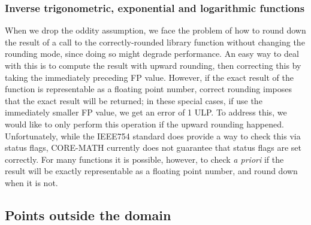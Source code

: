 \subsubsection{Inverse trigonometric, exponential and logarithmic functions}
When we drop the oddity assumption, we face the problem of how to round down the result of a call to the correctly-rounded library function without changing the rounding mode, since doing so might degrade performance.
An easy way to deal with this is to compute the result with upward rounding, then correcting this by taking the immediately preceding FP value.
However, if the exact result of the function is representable as a floating point number, correct rounding imposes that the exact result will be returned; in these special cases, if use the immediately smaller FP value, we get an error of 1 ULP.
To address this, we would like to only perform this operation if the upward rounding happened. Unfortunately, while the IEEE754 standard does provide a way to check this via status flags, CORE-MATH currently does not guarantee that status flags are set correctly.
For many functions it is possible, however, to check \emph{a priori} if the result will be exactly representable as a floating point number, and round down when it is not.

\FS{\dots}

\subsection{Points outside the domain}
